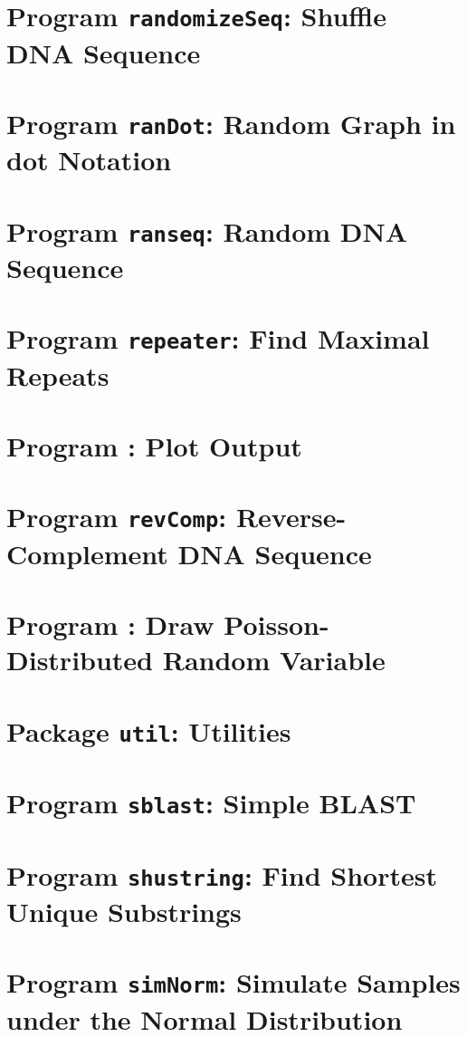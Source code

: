 \documentclass[a4paper]{report}
\begin{document}
\chapter{Program \texttt{randomizeSeq}: Shuffle DNA
  Sequence}\label{ch:rs}

\chapter{Program \texttt{ranDot}: Random Graph in dot Notation}\label{ch:rd}

\chapter{Program \texttt{ranseq}: Random DNA Sequence}\label{ch:ran}

\chapter{Program \texttt{repeater}: Find Maximal
  Repeats}\label{ch:rep}

\chapter{Program : Plot 
  Output}\label{ch:r2p}

\chapter{Program \texttt{revComp}: Reverse-Complement DNA
  Sequence}\label{ch:rev}

\chapter{Program : Draw Poisson-Distributed Random
  Variable}\label{ch:rpo}

\chapter{Package \texttt{util}: Utilities}\label{ch:uti}

\chapter{Program \texttt{sblast}: Simple BLAST}\label{ch:sb}

\chapter{Program \texttt{shustring}: Find Shortest Unique Substrings}\label{ch:shu}

\chapter{Program \texttt{simNorm}: Simulate Samples under the Normal
  Distribution}\label{ch:sn}

\end{document}

